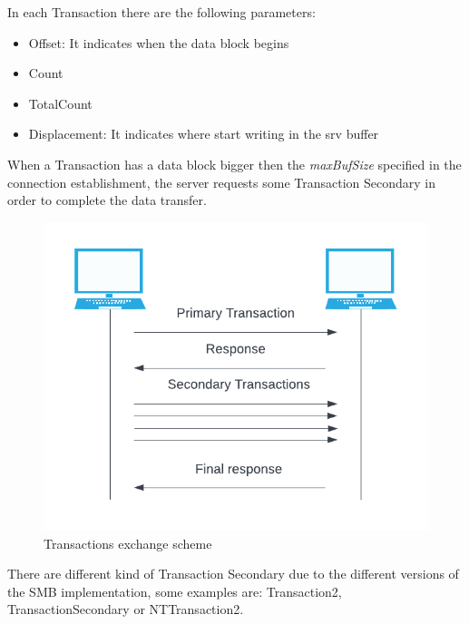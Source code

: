 In each Transaction there are the following parameters\cite{microsoft-transactions}:
\begin{itemize}
    \item Offset: It indicates when the data block begins
    \item Count
    \item TotalCount
    \item Displacement: It indicates where start writing in the srv buffer
\end{itemize}
\clearpage
\noindent When a Transaction has a data block bigger then the \textit{maxBufSize} specified in the connection establishment, the server requests some Transaction Secondary in order
to complete the data transfer\cite{microsoft-transactions}.\\
\begin{figure}[ht!]
    \centering
      \includegraphics[]{images/transactions_scheme.png}
      \caption{Transactions exchange scheme}
\end{figure}

\noindent There are different kind of Transaction Secondary due to the different versions of the SMB implementation,
some examples are: Transaction2, TransactionSecondary or NTTransaction2.